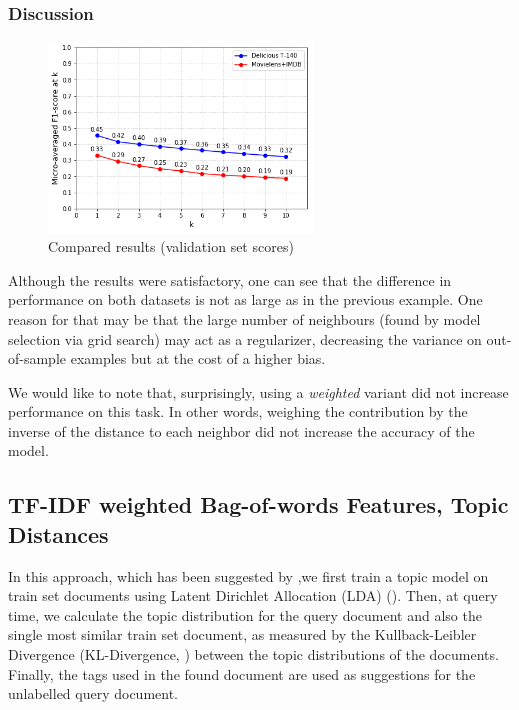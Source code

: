 \subsubsection{Discussion}

\begin{figure}[H]
    \centering
    \includegraphics[width=7cm]{chapters/05_experiments/images/proposal-1-compared-knn-tfidf.png}
    \caption{Compared results (validation set scores)}
    \label{fig:compared_ovr_svm}
\end{figure}

Although the results were satisfactory, one can see that the difference in performance on both datasets is not as large as in the previous example. One reason for that may be that the large number of neighbours (found by model selection via grid search) may act as a regularizer, decreasing the variance on out-of-sample examples but at the cost of a higher bias.

 We would like to note that, surprisingly, using a \textit{weighted} variant did not increase performance on this task. In other words, weighing the contribution by the inverse of the distance to each neighbor did not increase the accuracy of the model.

\subsection{TF-IDF weighted Bag-of-words Features, Topic Distances}

In this approach, which has been suggested by \cite{choubey_2011},we first train a topic model on train set documents using Latent Dirichlet Allocation (LDA) (\cite{blei_etal_2003}). Then, at query time, we calculate the topic distribution for the query document and also the single most similar train set document, as measured by the Kullback-Leibler Divergence (KL-Divergence, \cite{kullback_leibler_1951}) between the topic distributions of the documents. Finally, the tags used in the found document are used as suggestions for the unlabelled query document.

